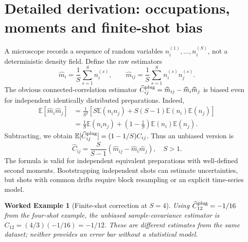 \documentclass[11pt,a4paper]{article}
\newtheorem{example}{Worked Example}
\begin{document}
\section{Detailed derivation: occupations, moments and finite-shot bias}
A microscope records a sequence of random variables $n_i^{(1)},\ldots,n_i^{(S)}$, not a deterministic density field. Define the raw estimators
\begin{equation}\widehat m_i=\frac1S\sum_{s=1}^{S}n_i^{(s)},\qquad \widehat m_{ij}=\frac1S\sum_{s=1}^{S}n_i^{(s)}n_j^{(s)}.\end{equation}
The obvious connected-correlation estimator $\widehat C^{\rm plug}_{ij}=\widehat m_{ij}-\widehat m_i\widehat m_j$ is biased even for independent identically distributed preparations. Indeed,
\begin{align}
\mathbb E[\widehat m_i\widehat m_j]&=\frac1{S^2}\left[S\mathbb E(n_in_j)+S(S-1)\mathbb E(n_i)\mathbb E(n_j)\right]\\
&=\frac1S\mathbb E(n_in_j)+\left(1-\frac1S\right)\mathbb E(n_i)\mathbb E(n_j).
\end{align}
Subtracting, we obtain $\mathbb E[\widehat C^{\rm plug}_{ij}]=(1-1/S)C_{ij}$. Thus an unbiased version is
\begin{equation}\boxed{\widehat C_{ij}=\frac{S}{S-1}\left(\widehat m_{ij}-\widehat m_i\widehat m_j\right),\quad S>1.}\end{equation}
The formula is valid for independent equivalent preparations with well-defined second moments. Bootstrapping independent shots can estimate uncertainties, but shots with common drifts require block resampling or an explicit time-series model.
\begin{example}[Finite-shot correction at $S=4$]
Using $\widehat C^{\rm plug}_{12}=-1/16$ from the four-shot example, the unbiased sample-covariance estimator is $\widehat C_{12}=(4/3)(-1/16)=-1/12$. These are different estimates from the same dataset; neither provides an error bar without a statistical model.
\end{example}
\end{document}
